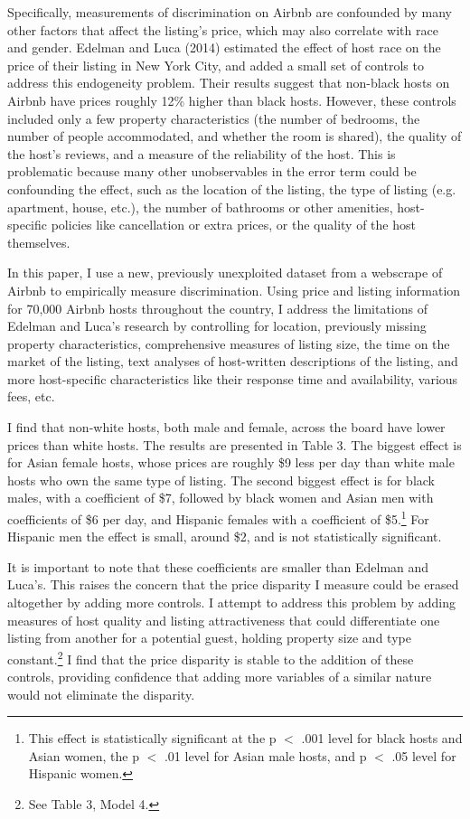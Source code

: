 Specifically, measurements of discrimination on Airbnb are confounded by many other factors that affect the listing's price, which may also correlate with race and gender. Edelman and Luca (2014) estimated the effect of host race on the price of their listing in New York City, and added a small set of controls to address this endogeneity problem. Their results suggest that non-black hosts on Airbnb have prices roughly 12\% higher than black hosts. However, these controls included only a few property characteristics (the number of bedrooms, the number of people accommodated, and whether the room is shared), the quality of the host's reviews, and a measure of the reliability of the host. This is problematic because many other unobservables in the error term could be confounding the effect, such as the location of the listing, the type of listing (e.g. apartment, house, etc.), the number of bathrooms or other amenities, host-specific policies like cancellation or extra prices, or the quality of the host themselves. 

In this paper, I use a new, previously unexploited dataset from a webscrape of Airbnb to empirically measure discrimination. Using price and listing information for 70,000 Airbnb hosts throughout the country, I address the limitations of Edelman and Luca's research by controlling for location, previously missing property characteristics, comprehensive measures of listing size, the time on the market of the listing, text analyses of host-written descriptions of the listing, and more host-specific characteristics like their response time and availability, various fees, etc. 

I find that non-white hosts, both male and female, across the board have lower prices than white hosts. The results are presented in Table 3. The biggest effect is for Asian female hosts, whose prices are roughly \$9 less per day than white male hosts who own the same type of listing. The second biggest effect is for black males, with a coefficient of \$7, followed by black women and Asian men with coefficients of \$6 per day, and Hispanic females with a coefficient of \$5.\footnote{This effect is statistically significant at the p $<$ .001 level for black hosts and Asian women, the p $<$ .01 level for Asian male hosts, and p $<$ .05 level for Hispanic women.} For Hispanic men the effect is small, around \$2, and is not statistically significant.

It is important to note that these coefficients are smaller than Edelman and Luca's. This raises the concern that the price disparity I measure could be erased altogether by adding more controls. I attempt to address this problem by adding measures of host quality and listing attractiveness that could differentiate one listing from another for a potential guest, holding property size and type constant.\footnote{See Table 3, Model 4.} I find that the price disparity is stable to the addition of these controls, providing confidence that adding more variables of a similar nature would not eliminate the disparity. 

